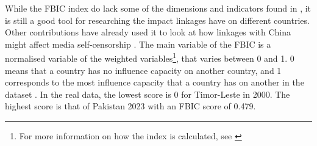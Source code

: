 While the FBIC index do lack some of the dimensions and indicators found in \citet{levitsky_linkage_2006}, it is still a good tool for researching the impact linkages have on different countries. Other contributions have already used it to look at how linkages with China might affect media self-censorship \citep{toettoe_foreign_2023}. The main variable of the FBIC is a normalised variable of the weighted variables\footnote{For more information on how the index is calculated, see \citet[pp. 26-31]{moyer_china-us_2021}}, that varies between 0 and 1. 0 means that a country has no influence capacity on another country, and 1 corresponds to the most influence capacity that a country has on another in the dataset \citep[p. 28]{moyer_china-us_2021}. In the real data, the lowest score is 0 for Timor-Leste in 2000. The highest score is that of Pakistan 2023 with an FBIC score of 0.479. 

\begin{table}[H]
\centering
\caption{Components of the FBIC index}
\label{tab:fbic}
\vspace{0.5em}
\end{table}

